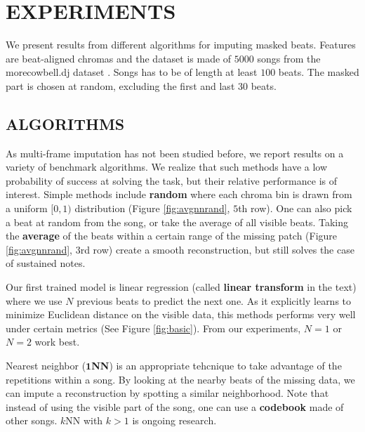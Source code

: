 \documentclass{article}
\begin{document}

\section{EXPERIMENTS}
\label{sec:exp}
We present results from different algorithms for imputing masked
beats.  Features are beat-aligned chromas and the dataset is made of
$5000$ songs from the morecowbell.dj dataset
\cite{Bertin-Mahieux2010a}. Songs has to be of length at least $100$
beats.  The masked part is chosen at random, excluding the first and
last $30$ beats.


\subsection{ALGORITHMS}
\label{ssec:algo}
As multi-frame imputation has not been studied before, we report
results on a variety of benchmark algorithms. We realize that such
methods have a low probability of success at solving the task, but
their relative performance is of interest.  Simple methods include
\textbf{random} where each chroma bin is drawn from a uniform $[0,1)$
distribution (Figure \ref{fig:avgnnrand}, $5$th row).  One can also
pick a beat at random from the song, or take the average of all
visible beats. Taking the \textbf{average} of the beats within a certain
range of the missing patch (Figure \ref{fig:avgnnrand}, $3$rd row)
create a smooth reconstruction, but still solves the case of
sustained notes.

Our first trained model is linear regression (called \textbf{linear
  transform} in
the text) where we use $N$ previous beats to predict the next one.  As
it explicitly learns to minimize Euclidean distance on the visible
data, this methods performs very well under certain metrics (See
Figure \ref{fig:basic}). From our experiments, $N=1$ or $N=2$ work
best.

Nearest neighbor ($\mathbf{1}$\textbf{NN}) is an appropriate tehcnique
to take advantage of the repetitions within a song. By looking at the
nearby beats of the missing data, we can impute a reconstruction by
spotting a similar neighborhood. Note that instead of using the
visible part of the song, one can use a \textbf{codebook} made of
other songs.  $k$NN with $k>1$ is ongoing research.
\end{document}
